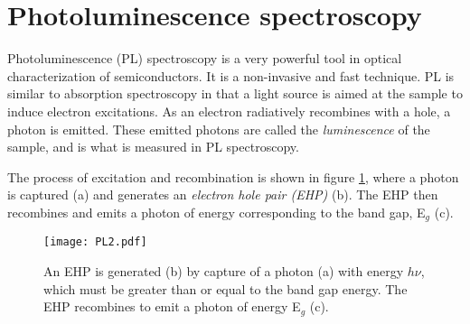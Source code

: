 			
			
		

	
\section{Photoluminescence spectroscopy}
\label{sec:pl}
Photoluminescence (PL) spectroscopy is a very powerful tool in optical characterization of semiconductors. It is a non-invasive and fast technique. PL is similar to absorption spectroscopy in that a light source is aimed at the sample to induce electron excitations. As an electron radiatively recombines with a hole, a photon is emitted. These emitted photons are called the \emph{luminescence} of the sample, and is what is measured in PL spectroscopy. 




The process of excitation and recombination is shown in figure \ref{fig:pl2}, where a photon is captured (a) and generates an \emph{electron hole pair (EHP)} (b). The EHP then recombines and emits a photon of energy corresponding to the band gap, E$_g$ (c). 

\begin{figure}[h]
\begin{center}
\texttt{[image: PL2.pdf]}
\caption{An EHP is generated (b) by capture of a photon (a) with energy $h\nu$, which must be greater than or equal to the band gap energy. The EHP recombines to emit a photon of energy E$_g$ (c).
\label{fig:pl2}}
\end{center}
\end{figure}

